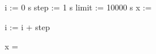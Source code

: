 \begin{preproc}
    i := 0 \cdot s
    step := 1 \cdot s
    limit := 10000 \cdot s
    x := 
            \begin{block}
                i := i + step
            \end{block}
    x = \placeholder{}
\end{preproc}
